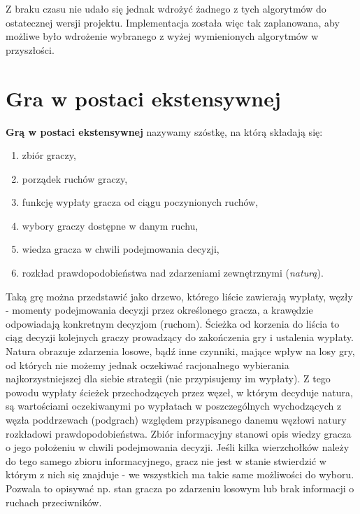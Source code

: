 \documentclass[polish]{standalone}
\begin{document}
Z braku czasu nie udało się jednak wdrożyć żadnego z tych algorytmów do ostatecznej wersji projektu. Implementacja
została więc tak zaplanowana, aby możliwe było wdrożenie wybranego z wyżej wymienionych algorytmów w przyszłości.

\section{Gra w postaci ekstensywnej}

\begin{definition}
\textbf{Grą w postaci ekstensywnej} nazywamy szóstkę, na którą składają się:
\begin{enumerate}
\item zbiór graczy,
\item porządek ruchów graczy,
\item funkcję wypłaty gracza od ciągu poczynionych ruchów,
\item wybory graczy dostępne w danym ruchu,
\item wiedza gracza w chwili podejmowania decyzji,
\item rozkład prawdopodobieństwa nad zdarzeniami zewnętrznymi (\textit{naturą}).
\end{enumerate}
\cite[str.~77--78]{FT-GT}
\end{definition}

Taką grę można przedstawić jako drzewo, którego liście zawierają wypłaty, węzły - momenty podejmowania decyzji przez
określonego gracza, a krawędzie odpowiadają konkretnym decyzjom (ruchom). Ścieżka od korzenia do liścia to ciąg decyzji
kolejnych graczy prowadzący do zakończenia gry i ustalenia wypłaty. Natura obrazuje zdarzenia losowe, bądź inne
czynniki, mające wpływ na losy gry, od których nie możemy jednak oczekiwać racjonalnego wybierania najkorzystniejszej
dla siebie strategii (nie przypisujemy im wypłaty). Z tego powodu wypłaty ścieżek przechodzących przez węzeł, w którym
decyduje natura, są wartościami oczekiwanymi po wypłatach w poszczególnych wychodzących z węzła poddrzewach (podgrach)
względem przypisanego danemu węzłowi natury rozkładowi prawdopodobieństwa. Zbiór informacyjny stanowi opis wiedzy
gracza o jego położeniu w chwili podejmowania decyzji. Jeśli kilka wierzchołków należy do tego samego zbioru
informacyjnego, gracz nie jest w stanie stwierdzić w którym z nich się znajduje - we wszystkich ma takie same
możliwości do wyboru. Pozwala to opisywać np. stan gracza po zdarzeniu losowym lub brak informacji o ruchach
przeciwników.
\end{document}
